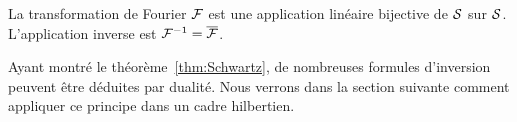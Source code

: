 \begin{theorem}\label{thm:Schwartz}
La transformation de Fourier $\mathcal{F}$ est une application lin{\'e}aire bijective de $\mathcal{S}$ sur $\mathcal{S}$.
L'application inverse est $\mathcal{F}^{-1} = \overline{\mathcal{F}}$.
\end{theorem}

Ayant montr{\'e} le th{\'e}or{\`e}me~\ref{thm:Schwartz}, de nombreuses formules d'inversion peuvent \^etre d{\'e}duites par dualit{\'e}.
Nous verrons dans la section suivante comment appliquer ce principe dans un cadre hilbertien.



